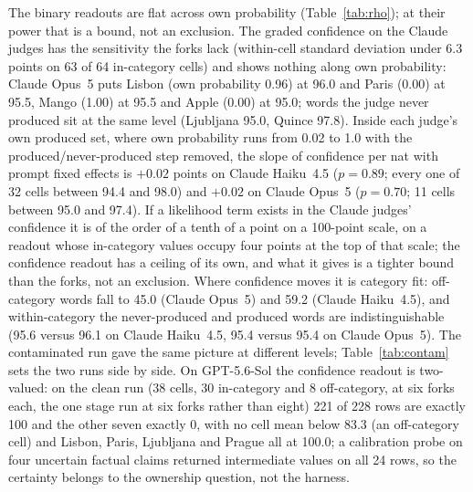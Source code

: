 \documentclass[twocolumn,10pt]{article}
\newcommand{\opus}{Claude Opus~5}
\newcommand{\haiku}{Claude Haiku~4.5}
\newcommand{\gpt}{GPT-5.6-Sol}
\begin{document}
The binary readouts are flat across own probability (Table~\ref{tab:rho}); at their power that is a bound, not an exclusion. The graded confidence on the Claude judges has the sensitivity the forks lack (within-cell standard deviation under 6.3 points on 63 of 64 in-category cells) and shows nothing along own probability: \opus{} puts Lisbon (own probability 0.96) at 96.0 and Paris (0.00) at 95.5, Mango (1.00) at 95.5 and Apple (0.00) at 95.0; words the judge never produced sit at the same level (Ljubljana 95.0, Quince 97.8). Inside each judge's own produced set, where own probability runs from 0.02 to 1.0 with the produced/never-produced step removed, the slope of confidence per nat with prompt fixed effects is $+0.02$ points on \haiku{} ($p=0.89$; every one of 32 cells between 94.4 and 98.0) and $+0.02$ on \opus{} ($p=0.70$; 11 cells between 95.0 and 97.4). If a likelihood term exists in the Claude judges' confidence it is of the order of a tenth of a point on a 100-point scale, on a readout whose in-category values occupy four points at the top of that scale; the confidence readout has a ceiling of its own, and what it gives is a tighter bound than the forks, not an exclusion. Where confidence moves it is category fit: off-category words fall to 45.0 (\opus{}) and 59.2 (\haiku{}), and within-category the never-produced and produced words are indistinguishable (95.6 versus 96.1 on \haiku{}, 95.4 versus 95.4 on \opus{}). The contaminated run gave the same picture at different levels; Table~\ref{tab:contam} sets the two runs side by side. On \gpt{} the confidence readout is two-valued: on the clean run (38 cells, 30 in-category and 8 off-category, at six forks each, the one stage run at six forks rather than eight) 221 of 228 rows are exactly 100 and the other seven exactly 0, with no cell mean below 83.3 (an off-category cell) and Lisbon, Paris, Ljubljana and Prague all at 100.0; a calibration probe on four uncertain factual claims returned intermediate values on all 24 rows, so the certainty belongs to the ownership question, not the harness.
\end{document}
